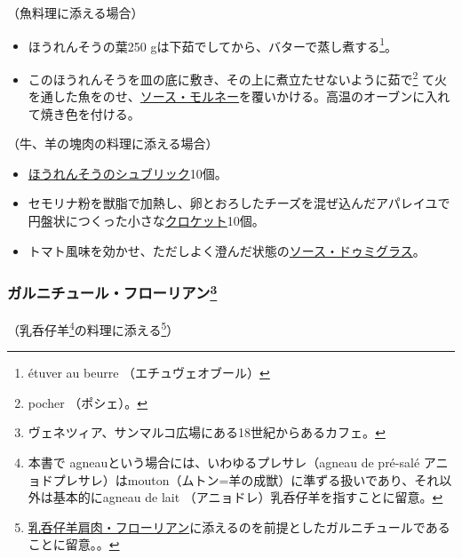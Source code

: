 \begin{recette}


（魚料理に添える場合）

\begin{itemize}
\item
  ほうれんそうの葉250 gは下茹でしてから、バターで蒸し煮する\footnote{étuver
    au beurre （エチュヴェオブール）}。
\item
  このほうれんそうを皿の底に敷き、その上に煮立たせないように茹で\footnote{pocher
    （ポシェ）。}
  て火を通した魚をのせ、\protect\hyperlink{sauce-mornay}{ソース・モルネー}を覆いかける。高温のオーブンに入れて焼き色を付ける。
\end{itemize}

（牛、羊の塊肉の料理に添える場合）

\begin{itemize}
\item
  \protect\hyperlink{sucric-d-epinards}{ほうれんそうのシュブリック}10個。
\item
  セモリナ粉を獣脂で加熱し、卵とおろしたチーズを混ぜ込んだアパレイユで円盤状につくった小さな\protect\hyperlink{croquettes}{クロケット}10個。
\item
  トマト風味を効かせ、ただしよく澄んだ状態の\protect\hyperlink{sauce-demi-glace}{ソース・ドゥミグラス}。
\end{itemize}

\hypertarget{garniture-Florian}{%
\subsubsection[ガルニチュール・フローリアン]{\texorpdfstring{ガルニチュール・フローリアン\footnote{ヴェネツィア、サンマルコ広場にある18世紀からあるカフェ。}}{ガルニチュール・フローリアン}}\label{garniture-Florian}}



（乳呑仔羊\footnote{本書で
  agneauという場合には、いわゆるプレサレ（agneau de pré-salé
  アニョドプレサレ）はmouton（ムトン=羊の成獣）に準ずる扱いであり、それ以外は基本的にagneau
  de lait （アニョドレ）乳呑仔羊を指すことに留意。}の料理に添える\footnote{\protect\hyperlink{epaule-d-agneau-florian}{乳呑仔羊肩肉・フローリアン}に添えるのを前提としたガルニチュールであることに留意。。}）


\end{recette}
